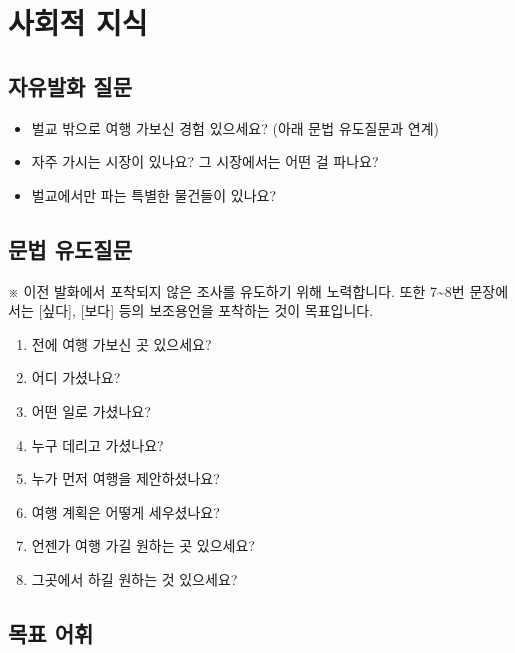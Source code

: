 \section{사회적 지식}

\subsection{자유발화 질문}
\begin{itemize}[noitemsep]
  \item 벌교 밖으로 여행 가보신 경험 있으세요? (아래 문법 유도질문과 연계)
  \item 자주 가시는 시장이 있나요? 그 시장에서는 어떤 걸 파나요? 
  \item 벌교에서만 파는 특별한 물건들이 있나요?
\end{itemize}

\subsection{문법 유도질문}
※ 이전 발화에서 포착되지 않은 조사를 유도하기 위해 노력합니다.
또한 7{\textasciitilde}8번 문장에서는 [싶다], [보다] 등의 보조용언을 포착하는 것이 목표입니다.

\begin{enumerate}[noitemsep]
  \item 전에 여행 가보신 곳 있으세요?
  \item 어디 가셨나요?
  \item 어떤 일로 가셨나요?
  \item 누구 데리고 가셨나요?
  \item 누가 먼저 여행을 제안하셨나요?
  \item 여행 계획은 어떻게 세우셨나요?
  \item 언젠가 여행 가길 원하는 곳 있으세요?
  \item 그곳에서 하길 원하는 것 있으세요?
\end{enumerate}

\subsection{목표 어휘}
%

